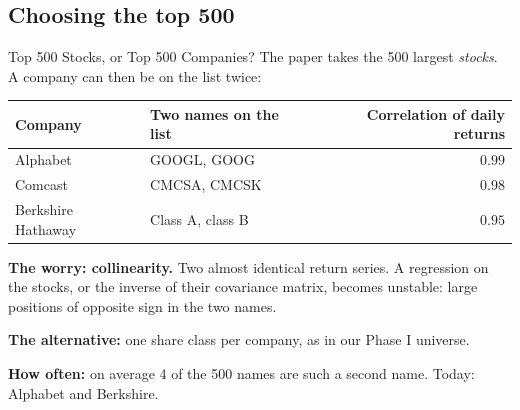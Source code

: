 \documentclass[11pt]{beamer}
\begin{document}
\subsection{Choosing the top 500}

\begin{frame}{Top 500 Stocks, or Top 500 Companies?}
The paper takes the 500 largest \emph{stocks}. A company can then be on the list twice:
\begin{center}
\small
\begin{tabular}{@{}llr@{}}
\toprule
Company & Two names on the list & Correlation of daily returns\\
\midrule
Alphabet & GOOGL, GOOG & $0.99$\\
Comcast & CMCSA, CMCSK & $0.98$\\
Berkshire Hathaway & Class A, class B & $0.95$\\
\bottomrule
\end{tabular}
\end{center}
\textbf{The worry: collinearity.} Two almost identical return series.
A regression on the stocks, or the inverse of their covariance matrix,
becomes unstable: large positions of opposite sign in the two names.

\smallskip
\textbf{The alternative:} one share class per company, as in our Phase I universe.

\smallskip
\textbf{How often:} on average 4 of the 500 names are such a second name.
Today: Alphabet and Berkshire.
\end{frame}
\end{document}
